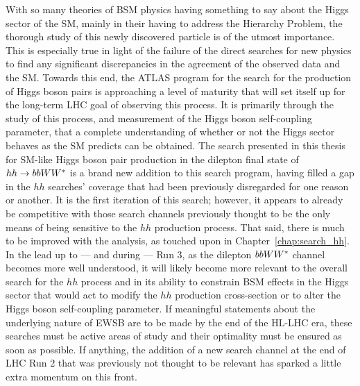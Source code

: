 With so many theories of BSM physics having something to say about the Higgs sector of the SM, mainly in their
having to address the Hierarchy Problem, the thorough study of this newly discovered particle
is of the utmost importance.
This is especially true in light of the failure of the direct searches for new physics to find any significant discrepancies
in the agreement of the observed data and the SM.
Towards this end, the ATLAS program for the search for the production of Higgs boson pairs is approaching
a level of maturity that will set itself up for the long-term LHC goal of observing this process.
It is primarily through the study of this process, and measurement of the Higgs boson self-coupling parameter, that a complete understanding of whether or not the Higgs sector behaves
as the SM predicts can be obtained.
The search presented in this thesis for SM-like Higgs boson pair production in the dilepton final state of $hh \rightarrow bbWW^*$
is a brand new addition to this search program, having filled a gap in the $hh$ searches' coverage that had
been previously disregarded for one reason or another.
It is the first iteration of this search; however, it appears to already be competitive with those search channels
previously thought to be the only means of being sensitive to the $hh$ production process.
That said, there is much to be improved with the analysis, as touched upon in Chapter~\ref{chap:search_hh}.
In the lead up to --- and during --- Run 3,
as the dilepton $bbWW^*$ channel becomes more well understood,
it will likely become more relevant to the overall search for the $hh$ process and in its ability
to constrain BSM effects in the Higgs sector that would act to modify the $hh$ production cross-section
or to alter the Higgs boson self-coupling parameter.
If meaningful statements about the underlying nature of EWSB
are to be made by the end of the HL-LHC era,
these searches must be active areas of study and their optimality must be ensured as soon as possible.
If anything, the addition of a new search channel at the end of LHC Run 2 that was previously not thought to be
relevant has sparked a little extra momentum on this front.
